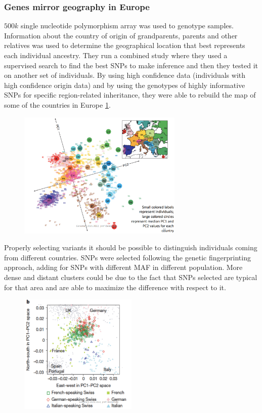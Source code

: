 		\subsubsection{Genes mirror geography in Europe}
		$500k$ single nucleotide polymorphism array was used to genotype samples.
		Information about the country of origin of grandparents, parents and other relatives was used to determine the geographical location that best represents each individual ancestry.
		They run a combined study where they used a supervised search to find the best SNPs to make inference and then they tested it on another set of individuals.
		By using high confidence data (individuals with high confidence origin data) and by using the genotypes of highly informative SNPs for specific region-related inheritance, they were able to rebuild the map of some of the countries in Europe \ref{fig:PCA_countries}.

		\begin{figure}[H]
			\centering
			\includegraphics[width=0.7\textwidth]{population.PNG}
			\caption{\label{fig:PCA_countries}}
		\end{figure}

		Properly selecting variants it should be possible to distinguish individuals coming from different countries.
		SNPs were selected following the genetic fingerprinting approach, adding for SNPs with different MAF in different population.
		More dense and distant clusters could be due to the fact that SNPs selected are typical for that area and are able to maximize the difference with respect to it.

		\begin{figure}[H]
			\centering
			\includegraphics[width=0.5\textwidth]{swiss.PNG}
			\caption{\label{fig: PCA_swiss}}
		\end{figure}

